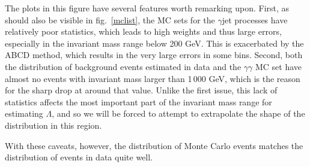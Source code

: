 The plots in this figure have several features worth remarking upon. First, as should also be visible in fig.~\ref{mclist}, the MC sets for the $\gamma$jet processes have relatively poor statistics, which leads to high weights and thus large errors, especially in the invariant mass range below 200 GeV. This is exacerbated by the ABCD method, which results in the very large errors in some bins. Second, both the distribution of background events estimated in data and the $\gamma\gamma$ MC set have almost no events with invariant mass larger than 1\,000 GeV, which is the reason for the sharp drop at around that value. Unlike the first issue, this lack of statistics affects the most important part of the invariant mass range for estimating $\Lambda$, and so we will be forced to attempt to extrapolate the shape of the distribution in this region.

With these caveats, however, the distribution of Monte Carlo events matches the distribution of events in data quite well.






